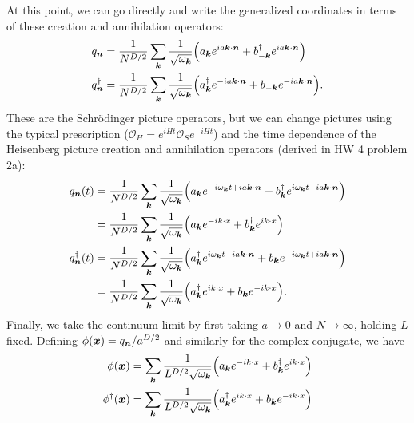 {At this point, we can go directly and write the generalized coordinates in terms of these creation and annihilation operators:
\begin{align}
    q_{\vb*{n}} &= \frac{1}{N^{D/2}} \sum_{\vb*{k}} \frac{1}{\sqrt{\omega_{\vb*{k}}}} \Big( a_{\vb*{k}} e^{i a \vb*{k} \cdot \vb*{n}} + b_{-\vb*{k}}^{\dagger} e^{i a \vb*{k} \cdot \vb*{n}} \Big) \\
    q_{\vb*{n}}^{\dagger} &= \frac{1}{N^{D/2}} \sum_{\vb*{k}} \frac{1}{\sqrt{\omega_{\vb*{k}}}} \Big( a_{\vb*{k}}^{\dagger} e^{-i a \vb*{k} \cdot \vb*{n}} + b_{-\vb*{k}} e^{-i a \vb*{k} \cdot \vb*{n}} \Big)
.\end{align}
These are the Schr\"{o}dinger picture operators, but we can change pictures using the typical prescription ($\mathcal{O}_{H} = e^{i H t} \mathcal{O}_{S} e^{-i H t}$) and the time dependence of the Heisenberg picture creation and annihilation operators (derived in HW 4 problem 2a):
\begin{align}
    q_{\vb*{n}}(t) &= \frac{1}{N^{D/2}} \sum_{\vb*{k}} \frac{1}{\sqrt{\omega_{\vb*{k}}}} \Big( a_{\vb*{k}} e^{- i \omega_{\vb*{k}} t + i a \vb*{k} \cdot \vb*{n}} + b_{\vb*{k}}^{\dagger} e^{i \omega_{\vb*{k}} t - i a \vb*{k} \cdot \vb*{n}} \Big) \nonumber \\
                   &= \frac{1}{N^{D/2}} \sum_{\vb*{k}} \frac{1}{\sqrt{\omega_{\vb*{k}}}} \Big( a_{\vb*{k}} e^{-i k \cdot x} + b_{\vb*{k}}^{\dagger} e^{i k \cdot x} \Big) \\
    q_{\vb*{n}}^{\dagger}(t) &= \frac{1}{N^{D/2}} \sum_{\vb*{k}} \frac{1}{\sqrt{\omega_{\vb*{k}}}} \Big( a_{\vb*{k}}^{\dagger} e^{i \omega_{\vb*{k}} t - i a \vb*{k} \cdot \vb*{n}} + b_{\vb*{k}} e^{-i \omega_{\vb*{k}}t + i a \vb*{k} \cdot \vb*{n}} \Big) \nonumber \\
                             &= \frac{1}{N^{D/2}} \sum_{\vb*{k}} \frac{1}{\sqrt{\omega_{\vb*{k}}}} \Big( a_{\vb*{k}}^{\dagger} e^{i k \cdot x} + b_{\vb*{k}} e^{-ik \cdot x} \Big)
.\end{align}
Finally, we take the continuum limit by first taking $a \rightarrow 0$ and $N \rightarrow \infty$, holding $L$ fixed.
Defining $\phi(\vb*{x}) = q_{\vb*{n}} / a^{D/2}$ and similarly for the complex conjugate, we have
\begin{align}
    \phi(\vb*{x}) &= \sum_{\vb*{k}} \frac{1}{L^{D/2} \sqrt{\omega_{\vb*{k}}}} \Big( a_{\vb*{k}} e^{-i k \cdot x} + b_{\vb*{k}}^{\dagger} e^{i k \cdot x} \Big) \\
    \phi^{\dagger}(\vb*{x}) &= \sum_{\vb*{k}} \frac{1}{L^{D/2} \sqrt{\omega_{\vb*{k}}}} \Big( a_{\vb*{k}}^{\dagger} e^{i k \cdot x} + b_{\vb*{k}} e^{-i k \cdot x} \Big)

\end{align}}

